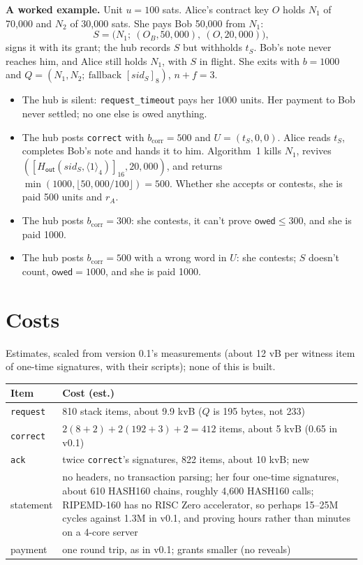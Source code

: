 \documentclass[11pt]{article}
\theoremstyle{plain}
\theoremstyle{definition}
\newcommand{\bcorr}{b_{\mathrm{corr}}}
\newcommand{\tx}[1]{\texttt{#1}}
\newcommand{\be}[2]{\langle #1\rangle_{#2}}
\newcommand{\pre}[2]{[#1]_{#2}}
\newcommand{\Ht}[1]{H_{\textsf{#1}}}
\newcommand{\sid}{\mathit{sid}}
\newcommand{\owed}{\mathsf{owed}}
\begin{document}
\textbf{A worked example.} Unit $u = 100$ sats. Alice's contract key $O$
holds $N_1$ of 70,000 and $N_2$ of 30,000 sats. She pays Bob 50,000 from
$N_1$:
\[
  S = \big(N_1;\ (O_B, 50{,}000),\ (O, 20{,}000)\big),
\]
signs it with its grant; the hub records $S$ but withholds $t_S$. Bob's
note never reaches him, and Alice still holds $N_1$, with $S$ in flight.
She exits with $b = 1000$ and $Q = (N_1, N_2;\ \text{fallback }
\pre{\sid_S}{8})$, $n + f = 3$.
\begin{itemize}[nosep]
\item The hub is silent: \tx{request\_timeout} pays her 1000 units. Her
  payment to Bob never settled; no one else is owed anything.
\item The hub posts \tx{correct} with $\bcorr = 500$ and $U = (t_S, 0,
  0)$. Alice reads $t_S$, completes Bob's note and hands it to him.
  Algorithm~1 kills $N_1$, revives $(\pre{\Ht{out}(\sid_S,
  \be{1}{4})}{16}, 20{,}000)$, and returns $\min(1000, \lfloor
  50{,}000/100\rfloor) = 500$. Whether she accepts or contests, she is
  paid 500 units and $r_A$.
\item The hub posts $\bcorr = 300$: she contests, it can't prove $\owed
  \le 300$, and she is paid 1000.
\item The hub posts $\bcorr = 500$ with a wrong word in $U$: she
  contests; $S$ doesn't count, $\owed = 1000$, and she is paid 1000.
\end{itemize}

\section{Costs}\label{sec:costs}

Estimates, scaled from version 0.1's measurements (about 12 vB per
witness item of one-time signatures, with their scripts); none of this
is built.

\begin{center}
\begin{tabularx}{\linewidth}{lL}
\toprule
Item & Cost (est.) \\
\midrule
\tx{request} & 810 stack items, about 9.9 kvB ($Q$ is 195 bytes, not 233) \\
\tx{correct} & $2(8 + 2) + 2(192 + 3) + 2 = 412$ items, about 5 kvB (0.65 in v0.1) \\
\tx{ack} & twice \tx{correct}'s signatures, 822 items, about 10 kvB; new \\
statement & no headers, no transaction parsing; her four one-time signatures, about 610 HASH160 chains, roughly 4,600 HASH160 calls; RIPEMD-160 has no RISC Zero accelerator, so perhaps 15--25M cycles against 1.3M in v0.1, and proving hours rather than minutes on a 4-core server \\
payment & one round trip, as in v0.1; grants smaller (no reveals) \\
\bottomrule
\end{tabularx}
\end{center}
\end{document}
